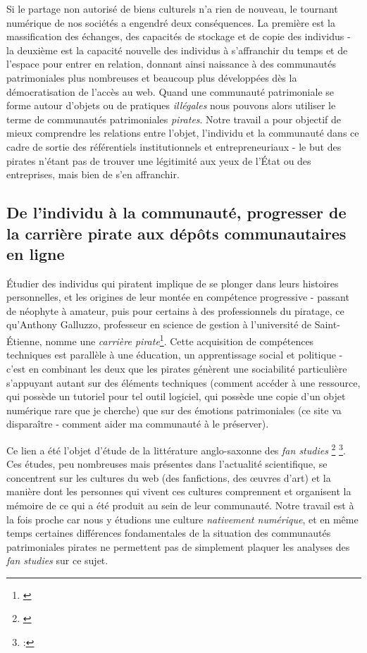 Si le partage non autorisé de biens culturels n'a rien de nouveau, le tournant numérique de nos sociétés a engendré deux conséquences. La première est la massification des échanges, des capacités de stockage et de copie des individus - la deuxième est la capacité nouvelle des individus à s'affranchir du temps et de l'espace pour entrer en relation, donnant ainsi naissance à des communautés patrimoniales plus nombreuses et beaucoup plus développées dès la démocratisation de l'accès au web. Quand une communauté patrimoniale se forme autour d'objets ou de pratiques \textit{illégales} nous pouvons alors utiliser le terme de communautés patrimoniales \textit{pirates}. Notre travail a pour objectif de mieux comprendre les relations entre l'objet, l'individu et la communauté dans ce cadre de sortie des référentiels institutionnels et entrepreneuriaux - le but des pirates n'étant pas de trouver une légitimité aux yeux de l'État ou des entreprises, mais bien de s'en affranchir.  

\subsection*{De l'individu à la communauté, progresser de la carrière pirate aux dépôts communautaires en ligne}

Étudier des individus qui piratent implique de se plonger dans leurs histoires personnelles, et les origines de leur montée en compétence progressive - passant de néophyte à amateur, puis pour certains à des professionnels du piratage, ce qu'Anthony Galluzzo, professeur en science de gestion à l'université de Saint-Étienne, nomme une \textit{carrière pirate}\footnote{\cite{galluzzo_longevite_2021}}. Cette acquisition de compétences techniques est parallèle à une éducation, un apprentissage social et politique - c'est en combinant les deux que les pirates génèrent une sociabilité particulière s'appuyant autant sur des éléments techniques (comment accéder à une ressource, qui possède un tutoriel pour tel outil logiciel, qui possède une copie d'un objet numérique rare que je cherche) que sur des émotions patrimoniales (ce site va disparaître - comment aider ma communauté à le préserver). 

Ce lien a été l'objet d'étude de la littérature anglo-saxonne des \textit{fan studies} \footnote{\cite{taylor_save_nodate}} \footnote{:\cite{de_kosnik_rogue_2016}}. Ces études, peu nombreuses mais présentes dans l'actualité scientifique, se concentrent sur les cultures du web (des fanfictions, des œuvres d'art) et la manière dont les personnes qui vivent ces cultures comprennent et organisent la mémoire de ce qui a été produit au sein de leur communauté. Notre travail est à la fois proche car nous y étudions une culture \textit{nativement numérique}, et en même temps certaines différences fondamentales de la situation des communautés patrimoniales pirates ne permettent pas de simplement plaquer les analyses des \textit{fan studies} sur ce sujet. 

